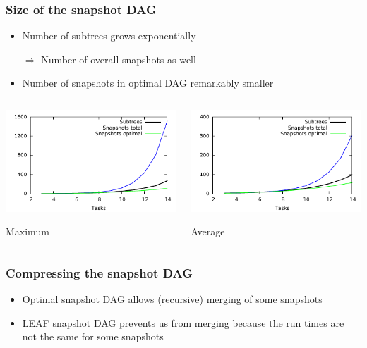 \documentclass{beamer}
\begin{document}
\begin{frame}
  \frametitle{Size of the snapshot DAG}
  \begin{itemize}
  \item Number of subtrees grows exponentially
    
    $\Rightarrow$ Number of overall snapshots as well
  \item Number of snapshots in optimal DAG remarkably smaller
  \end{itemize}
  \begin{columns}
    \begin{column}{.5\textwidth}
      \centering
      \includegraphics[scale=.8]{max.pdf}
      
      Maximum
    \end{column}
    \begin{column}{.5\textwidth}
      \centering
      \includegraphics[scale=.8]{avg.pdf}
      
      Average
    \end{column}
  \end{columns}
\end{frame}

\begin{frame}
  \frametitle{Compressing the snapshot DAG}
  \begin{itemize}
  \item Optimal snapshot DAG allows (recursive) merging of some snapshots
  \item LEAF snapshot DAG prevents us from merging because the run times are not the same for some snapshots
  \end{itemize}
\end{frame}
\end{document}
